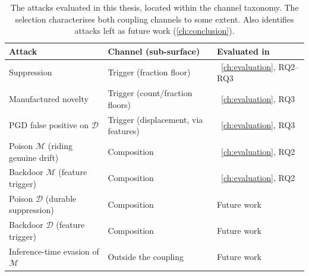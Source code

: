\begin{table}[H]
\centering
\small
\caption{The attacks evaluated in this thesis, located within the channel taxonomy. The selection characterises both coupling channels to some extent. Also identifies attacks left as future work (\cref{ch:conclusion}).}
\label{tab:axt-scope}
\begin{tabular}{@{}lll@{}}
\toprule
Attack & Channel (sub-surface) & Evaluated in \\
\midrule
Suppression                       & Trigger (fraction floor)              &~\cref{ch:evaluation}, RQ2--RQ3 \\
Manufactured novelty              & Trigger (count/fraction floors)       &~\cref{ch:evaluation}, RQ3 \\
PGD false positive on $\mathcal{D}$ & Trigger (displacement, via features) &~\cref{ch:evaluation}, RQ3 \\
Poison $\mathcal{M}$ (riding genuine drift) & Composition                   &~\cref{ch:evaluation}, RQ2 \\
Backdoor $\mathcal{M}$ (feature trigger)   & Composition                   &~\cref{ch:evaluation}, RQ2 \\
\midrule
Poison $\mathcal{D}$ (durable suppression) & Composition                   & Future work \\
Backdoor $\mathcal{D}$ (feature trigger)   & Composition                   & Future work \\
Inference-time evasion of $\mathcal{M}$ & Outside the coupling             & Future work \\
\bottomrule
\end{tabular}
\end{table}
